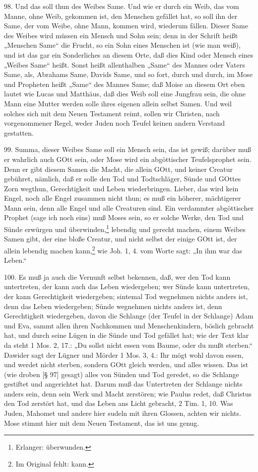 98. Und das soll thun des Weibes Same. Und wie er durch ein Weib, das vom Manne, ohne Weib, gekommen ist, den Menschen gefället hat, so soll ihn der Same, der vom Weibe, ohne Mann, kommen wird, wiederum fällen. Dieser Same des Weibes wird müssen ein Mensch und Sohn sein; denn in der Schrift heißt „Menschen Same“ die Frucht, so ein Sohn eines Menschen ist (wie man weiß), und ist das gar ein Sonderliches an diesem Orte, daß dies Kind oder Mensch eines „Weibes Same“ heißt. Sonst heißt allenthalben „Same“ des Mannes oder Vaters Same, als, Abrahams Same, Davids Same, und so fort, durch und durch, im Mose und Propheten heißt „Same“ des Mannes Same; daß Moise an diesem Ort eben lautet wie Lucas und Matthäus, daß dies Weib soll eine Jungfrau sein, die ohne Mann eine Mutter werden solle ihres eigenen allein selbst Samen. Und weil solches sich mit dem Neuen Testament reimt, sollen wir Christen, nach vorgenommener Regel, weder Juden noch Teufel keinen andern Verstand gestatten.

99. Summa, dieser Weibes Same soll ein Mensch sein, das ist gewiß; darüber muß er wahrlich auch GOtt sein, oder Mose wird ein abgöttischer Teufelsprophet sein. Denn er gibt diesem Samen die Macht, die allein GOtt, und keiner Creatur gebühret, nämlich, daß er solle den Tod und Todtschläger, Sünde und GOttes Zorn wegthun, Gerechtigkeit und Leben wiederbringen. Lieber, das wird kein Engel, noch alle Engel zusammen nicht thun; es muß ein höherer, mächtigerer Mann sein, denn alle Engel und alle Creaturen sind. Ein verdammter abgöttischer Prophet (sage ich noch eins) muß Moses sein, so er solche Werke, den Tod und Sünde erwürgen und überwinden,\footnote{Erlanger: überwunden.} lebendig und gerecht machen, einem Weibes Samen gibt, der eine bloße Creatur, und nicht selbst der einige GOtt ist, der allein lebendig machen kann,\footnote{Im Original fehlt: kann.} wie Joh. 1, 4. vom Worte sagt: „In ihm war das Leben.“

100. Es muß ja auch die Vernunft selbst bekennen, daß, wer den Tod kann untertreten, der kann auch das Leben wiedergeben; wer Sünde kann untertreten, der kann Gerechtigkeit wiedergeben; sintemal Tod wegnehmen nichts anders ist, denn das Leben wiedergeben; Sünde wegnehmen nichts anders ist, denn Gerechtigkeit wiedergeben, davon die Schlange (der Teufel in der Schlange) Adam und Eva, sammt allen ihren Nachkommen und Menschenkindern, böslich gebracht hat, und durch seine Lügen in die Sünde und Tod gefället hat; wie der Text klar da steht 1 Mos. 2, 17.: „Du sollst nicht essen vom Baume, oder du mußt sterben.“ Dawider sagt der Lügner und Mörder 1 Mos. 3, 4.: Ihr mögt wohl davon essen, und werdet nicht sterben, sondern GOtt gleich werden, und alles wissen. Das ist (wie droben [§ 97] gesagt) alles von Sünden und Tod geredet, so die Schlange gestiftet und angerichtet hat. Darum muß das Untertreten der Schlange nichts anders sein, denn sein Werk und Macht zerstören; wie Paulus redet, daß Christus den Tod zerstört hat, und das Leben ans Licht gebracht, 2 Tim. 1, 10. Was Juden, Mahomet und andere hier sudeln mit ihren Glossen, achten wir nichts. Mose stimmt hier mit dem Neuen Testament, das ist uns genug.

